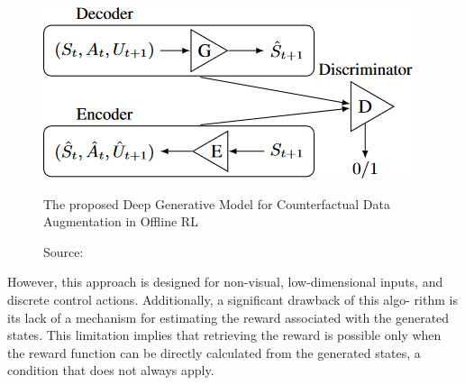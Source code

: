 \begin{figure}[h]
    \centering
    \includegraphics[width=.5\textwidth]{figures/ch2/2.rlcf.png}
    \caption{The proposed Deep Generative Model for Counterfactual Data Augmentation in Offline RL}
    \vspace{-10px}
    \caption*{\scriptsize{Source: \cite{lu2020}}}
    \label{fig:rlcf}
\end{figure}

However, this approach is designed for non-visual,
low-dimensional inputs, and discrete control
actions. Additionally, a significant drawback of this algo-
rithm is its lack of a mechanism for estimating the reward
associated with the generated states. This limitation implies
that retrieving the reward is possible only when the reward
function can be directly calculated from the generated states,
a condition that does not always apply.


